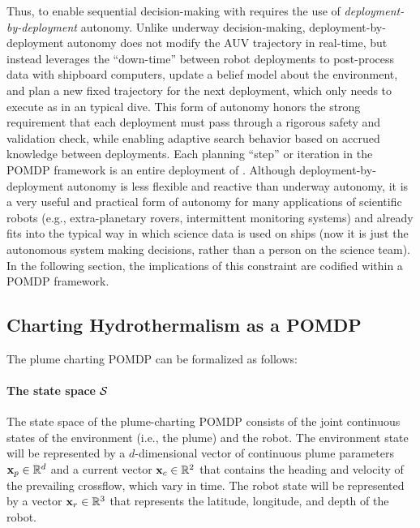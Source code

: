 Thus, to enable sequential decision-making with \Sentry requires the use of \emph{deployment-by-deployment} autonomy. Unlike underway decision-making, deployment-by-deployment autonomy does not modify the AUV trajectory in real-time, but instead leverages the ``down-time'' between robot deployments to post-process data with shipboard computers, update a belief model about the environment, and plan a new fixed trajectory for the next deployment, which \Sentry only needs to execute as in an typical dive. This form of autonomy honors the strong requirement that each deployment must pass through a rigorous safety and validation check, while enabling adaptive search behavior based on accrued knowledge between deployments. Each planning ``step'' or iteration in the POMDP framework is an entire deployment of \Sentry. Although deployment-by-deployment autonomy is less flexible and reactive than underway autonomy, it is a very useful and practical form of autonomy for many applications of scientific robots (e.g., extra-planetary rovers, intermittent monitoring systems) and already fits into the typical way in which science data is used on ships (now it is just the autonomous system making decisions, rather than a person on the science team). In the following section, the implications of this constraint are codified within a POMDP framework.

\subsection{Charting Hydrothermalism as a POMDP}
\label{sec:pomdp}
The plume charting POMDP can be formalized as follows: 

\paragraph{The state space $\mathcal{S}$} The state space of the plume-charting POMDP consists of the joint continuous states of the environment (i.e., the plume) and the robot. The environment state will be represented by a $d$-dimensional vector of continuous plume parameters $\mathbf{x}_p \in \mathbb{R}^d$ and a current vector $\mathbf{x}_c \in \mathbb{R}^2$ that contains the heading and velocity of the prevailing crossflow, which vary in time. The robot state will be represented by a vector $\mathbf{x}_r \in \mathbb{R}^3$ that represents the latitude, longitude, and depth of the robot.

